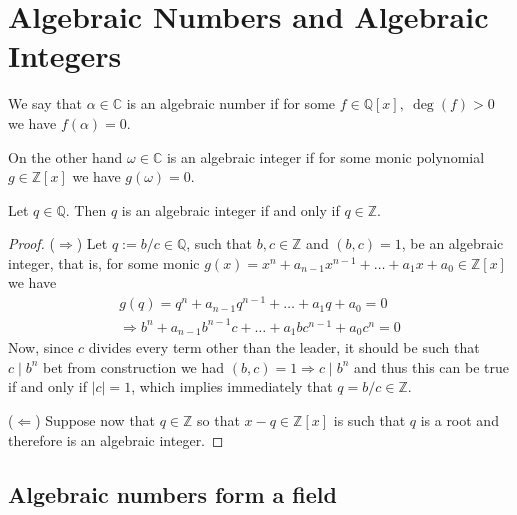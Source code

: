 \section{Algebraic Numbers and Algebraic Integers}

\begin{definition}
   We say that \(\alpha \in \mathbb{C}\) is an algebraic number if for some \(f
   \in \mathbb{Q}[x],\ \deg(f) > 0\) we have \(f(\alpha) = 0\). 

   On the other hand \(\omega \in \mathbb{C}\) is an algebraic integer if for
   some monic polynomial \(g \in \mathbb{Z}[x]\) we have \(g(\omega) = 0\).
\end{definition}

\begin{proposition}
   Let \(q \in \mathbb{Q}\). Then \(q\) is an algebraic integer if and only if
   \(q \in \mathbb{Z}\).
\end{proposition}

\begin{proof}
   (\(\Rightarrow\)) Let \(q := b/c \in \mathbb{Q}\), such that \(b, c \in
   \mathbb{Z}\) and \((b, c) = 1\), be an algebraic integer, that is, for some
   monic \(g(x) = x^n + a_{n-1}x^{n-1} + \dots + a_1 x + a_0 \in \mathbb{Z}[x]\)
   we have 
   \begin{gather*}
      g(q) = q^n + a_{n-1}q^{n-1} + \dots + a_1 q + a_0 = 0 \\
      \Rightarrow
      b^n + a_{n-1} b^{n-1}c + \dots + a_1 b c^{n-1} + a_0 c^n = 0
   \end{gather*}
   Now, since \(c\) divides every term other than the leader, it should be such
   that \(c \mid b^n\) bet from construction we had \((b, c) = 1 \Rightarrow c
   \mid b^n\) and thus this can be true if and only if \(|c| = 1\), which
   implies immediately that \(q = b/c \in \mathbb{Z}\).

   (\(\Leftarrow\)) Suppose now that \(q \in \mathbb{Z}\) so that \(x - q \in
   \mathbb{Z}[x]\) is such that \(q\) is a root and therefore is an algebraic
   integer.
\end{proof}

\subsection{Algebraic numbers form a field}

